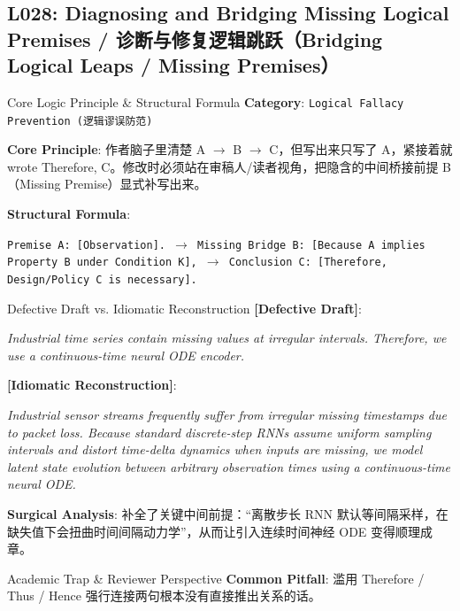 \subsection{L028: Diagnosing and Bridging Missing Logical Premises / 诊断与修复逻辑跳跃（Bridging Logical Leaps / Missing Premises）}\label{sec:logic:L028}
\begin{ConceptBox}{Core Logic Principle \& Structural Formula}
\textbf{Category}: \texttt{Logical Fallacy Prevention (逻辑谬误防范)}\par\vspace{3pt}
\textbf{Core Principle}: 作者脑子里清楚 A $\to$ B $\to$ C，但写出来只写了 A，紧接着就 wrote Therefore, C。修改时必须站在审稿人/读者视角，把隐含的中间桥接前提 B（Missing Premise）显式补写出来。\par\vspace{4pt}
\textbf{Structural Formula}:\par\noindent\texttt{Premise A: [Observation]. $\to$ Missing Bridge B: [Because A implies Property B under Condition K], $\to$ Conclusion C: [Therefore, Design/Policy C is necessary].}
\end{ConceptBox}
\begin{ExampleBox}{Defective Draft vs. Idiomatic Reconstruction}
\textbf{\color{TargetHighlight}[Defective Draft]}:\par\textit{Industrial time series contain missing values at irregular intervals. Therefore, we use a continuous-time neural ODE encoder.}\par\vspace{4pt}
\textbf{\color{AcadNavy}[Idiomatic Reconstruction]}:\par\textit{Industrial sensor streams frequently suffer from irregular missing timestamps due to packet loss. Because standard discrete-step RNNs assume uniform sampling intervals and distort time-delta dynamics when inputs are missing, we model latent state evolution between arbitrary observation times using a continuous-time neural ODE.}\par\vspace{4pt}
\textbf{Surgical Analysis}: 补全了关键中间前提：“离散步长 RNN 默认等间隔采样，在缺失值下会扭曲时间间隔动力学”，从而让引入连续时间神经 ODE 变得顺理成章。
\end{ExampleBox}
\begin{TipBox}{Academic Trap \& Reviewer Perspective}
\textbf{Common Pitfall}: 滥用 Therefore / Thus / Hence 强行连接两句根本没有直接推出关系的话。
\end{TipBox}
\vspace{6pt}
